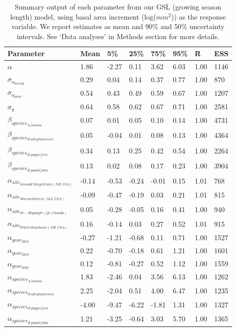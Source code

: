 \documentclass{article}\usepackage[]{graphicx}\usepackage[]{xcolor}
\begin{document}
\begin{table}[ht]
\centering
\caption{Summary output of each parameter from our GSL (growing season length) model, using basal area increment (log($mm^2$)) as the response variable. We report estimates as mean and 90\% and 50\% uncertainty intervals. See `Data analyses' in Methods section for more details.} 
\label{tab:BAItab_gsl}
\begin{tabular}{llllllll}
  \hline
Parameter & Mean & 5\% & 25\% & 75\% & 95\% & \^R & ESS \\ 
  \hline
$\alpha$ & 1.86 & -2.27 & 0.11 & 3.62 & 6.03 & 1.00 & 1146 \\ 
  $\sigma_{\alpha_{treeid}}$ & 0.29 & 0.04 & 0.14 & 0.37 & 0.77 & 1.00 & 870 \\ 
  $\sigma_{\alpha_{prov}}$ & 0.54 & 0.43 & 0.49 & 0.59 & 0.67 & 1.00 & 1207 \\ 
  $\sigma_{y}$ & 0.64 & 0.58 & 0.62 & 0.67 & 0.71 & 1.00 & 2581 \\ 
  $\beta_{species_{A. incana}}$ & 0.07 & 0.01 & 0.05 & 0.10 & 0.14 & 1.00 & 4731 \\ 
  $\beta_{species_{B. alleghaniensis}}$ & 0.05 & -0.04 & 0.01 & 0.08 & 0.13 & 1.00 & 4364 \\ 
  $\beta_{species_{B. papyrifera}}$ & 0.34 & 0.13 & 0.25 & 0.42 & 0.54 & 1.00 & 2264 \\ 
  $\beta_{species_{B. populifolia}}$ & 0.13 & 0.02 & 0.08 & 0.17 & 0.23 & 1.00 & 3904 \\ 
  $\alpha_{site_{Second College Grant (NH, USA)}}$ & -0.14 & -0.53 & -0.24 & -0.01 & 0.15 & 1.01 & 768 \\ 
  $\alpha_{site_{Harvard Forest (MA, USA)}}$ & -0.09 & -0.47 & -0.19 & 0.03 & 0.21 & 1.01 & 815 \\ 
  $\alpha_{site_{St-Hippolyte (Qc, Canada)}}$ & 0.05 & -0.28 & -0.05 & 0.16 & 0.41 & 1.00 & 940 \\ 
  $\alpha_{site_{White Mountains (NH, USA)}}$ & 0.16 & -0.14 & 0.03 & 0.27 & 0.52 & 1.01 & 915 \\ 
  $\alpha_{year_{2018}}$ & -0.27 & -1.21 & -0.68 & 0.11 & 0.71 & 1.00 & 1527 \\ 
  $\alpha_{year_{2019}}$ & 0.22 & -0.70 & -0.18 & 0.61 & 1.21 & 1.00 & 1601 \\ 
  $\alpha_{year_{2020}}$ & 0.12 & -0.81 & -0.27 & 0.52 & 1.12 & 1.00 & 1559 \\ 
  $\alpha_{species_{A. incana}}$ & 1.83 & -2.46 & 0.04 & 3.56 & 6.13 & 1.00 & 1262 \\ 
  $\alpha_{species_{B. alleghaniensis}}$ & 2.25 & -2.04 & 0.51 & 4.00 & 6.47 & 1.00 & 1235 \\ 
  $\alpha_{species_{B. papyrifera}}$ & -4.00 & -9.47 & -6.22 & -1.81 & 1.31 & 1.00 & 1327 \\ 
  $\alpha_{species_{B. populifolia}}$ & 1.21 & -3.25 & -0.64 & 3.03 & 5.70 & 1.00 & 1365 \\ 
   \hline
\end{tabular}
\end{table}
\end{document}
